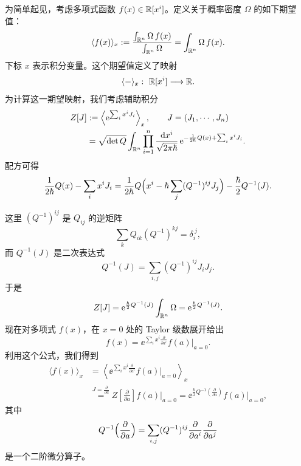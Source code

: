 为简单起见，考虑多项式函数 $f(x)\in\mathbb{R}[x^{i}]$。定义关于概率密度 $\Omega$ 的如下期望值：
\[
  \langle f(x)\rangle_x
  :=\frac{\int_{\mathbb{R}^{n}}\Omega\,f(x)}{\int_{\mathbb{R}^{n}}\Omega}
  =\int_{\mathbb{R}^{n}}\Omega\,f(x).
\]
下标 $x$ 表示积分变量。这个期望值定义了映射
\[
  \langle-\rangle_x:\ \R[x^{i}]\longrightarrow\R.
\]
为计算这一期望映射，我们考虑辅助积分
\[
  \begin{aligned}
    Z[J]&:=\left\langle \mathrm{e}^{\sum_{i}x^{i}J_i}\right\rangle_x,
    \qquad J=(J_1,\cdots,J_n)\\
    &=\sqrt{\det Q}\int_{\mathbb{R}^{n}}\prod_{i=1}^{n}\frac{\mathrm{d} x^{i}}{\sqrt{2\pi\hbar}}\,
    \mathrm{e}^{-\frac{1}{2\hbar}Q(x)+\sum_{i}x^{i}J_i}.
  \end{aligned}
\]
配方可得
\[
  \frac{1}{2\hbar}Q(x)-\sum_{i}x^{i}J_i
  =\frac{1}{2\hbar}Q\Bigl(x^{i}-\hbar\sum_{j}(Q^{-1})^{ij}J_j\Bigr)
  -\frac{\hbar}{2}Q^{-1}(J).
\]


这里 $(Q^{-1})^{ij}$ 是 $Q_{ij}$ 的逆矩阵
\[
  \sum_{k}Q_{ik}(Q^{-1})^{kj}=\delta_i^{\ j},
\]
而 $Q^{-1}(J)$ 是二次表达式
\[
  Q^{-1}(J)=\sum_{i,j}(Q^{-1})^{ij}J_iJ_j.
\]
于是
\[
  Z[J]=\mathrm{e}^{\frac{\hbar}{2}Q^{-1}(J)}\int_{\mathbb{R}^{n}}\Omega
  =\mathrm{e}^{\frac{\hbar}{2}Q^{-1}(J)}.
\]
现在对多项式 $f(x)$，在 $x=0$ 处的 Taylor 级数展开给出
\[
  f(x)=\ee^{\sum_{i}x^{i}\frac{\partial}{\partial a^{i}}}f(a)\Big|_{a=0}.
\]
利用这个公式，我们得到
\[
  \begin{aligned}
    \langle f(x)\rangle_x
    &=\left\langle
    \ee^{\sum_{i}x^{i}\frac{\partial}{\partial a^{i}}}f(a)\Big|_{a=0}
    \right\rangle_x\\
    &\overset{J=\frac{\partial}{\partial a}}{=}
    Z\left[\frac{\partial}{\partial a}\right]f(a)\Big|_{a=0}
    =\ee^{\frac{\hbar}{2}Q^{-1}\left(\frac{\partial}{\partial a}\right)}
    f(a)\Big|_{a=0},
  \end{aligned}
\]
其中
\[
  Q^{-1}\Bigl(\frac{\partial}{\partial a}\Bigr)
  =\sum_{i,j}(Q^{-1})^{ij}\frac{\partial}{\partial a^{i}}
  \frac{\partial}{\partial a^{j}}
\]
是一个二阶微分算子。


